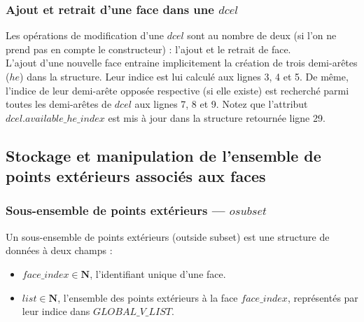 \documentclass[]{article}
\begin{document}
\begin{multicols}{2}
	\subsubsection{Ajout et retrait d'une face dans une $dcel$}
	Les opérations de modification d'une $dcel$ sont au nombre de deux (si l'on ne prend pas en compte le constructeur) : l'ajout et le retrait de face.\\
	
	L'ajout d'une nouvelle face entraine implicitement la création de trois demi-arêtes ($he$) dans la structure. Leur indice est lui calculé aux lignes 3, 4 et 5. De même, l'indice de leur demi-arête opposée respective (si elle existe) est recherché parmi toutes les demi-arêtes de $dcel$ aux lignes 7, 8 et 9.
	Notez que l'attribut $dcel.available\_he\_index$ est mis à jour dans la structure retournée ligne 29.
%		
%		

\subsection{Stockage et manipulation de l'ensemble de points extérieurs associés aux faces}
	\subsubsection{Sous-ensemble de points extérieurs — $osubset$}
	Un sous-ensemble de points extérieurs (outside subset) est une structure de données à deux champs :
	\begin{itemize}
		\item $face\_index \in \mathbf{N}$, l'identifiant unique d'une face.
		\item $list \in \mathbf{N}$, l'ensemble des points extérieurs à la face $face\_index$, représentés par leur indice dans $GLOBAL\_V\_LIST$.
	\end{itemize}


\end{multicols}
\end{document}
